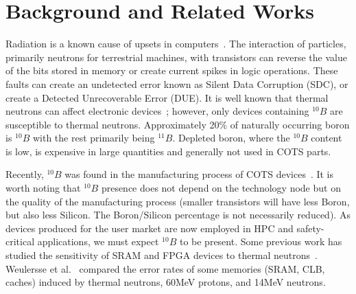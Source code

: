 \section{Background and Related Works}
\label{sec_background}

%

Radiation is a known cause of upsets in computers~\cite{Jedec2006}. The interaction of particles, primarily neutrons for terrestrial machines, with transistors can reverse the value of the bits stored in memory or create current spikes in logic operations. These faults can create an undetected error known as Silent Data Corruption (SDC), or create a Detected Unrecoverable Error (DUE). It is well known that thermal neutrons can affect electronic devices~\cite{Baumann2005, ziegler2003}; however, only devices containing $^{10}B$ are susceptible to thermal neutrons. 
Approximately 20\% of naturally occurring boron is $^{10}B$ with the rest primarily being $^{11}B$. Depleted boron, where the $^{10}B$ content is low, is expensive in large quantities and generally not used in COTS parts. %

Recently, $^{10}B$ was found in the manufacturing process of COTS devices~\cite{wen2010b10}. It is worth noting that $^{10}B$ presence does not depend on the technology node but on the quality of the manufacturing process (smaller transistors will have less Boron, but also less Silicon. The Boron/Silicon percentage is not necessarily reduced). As devices produced for the user market are now employed in HPC and safety-critical applications, we must expect $^{10}B$ to be present. 
Some previous work has studied the sensitivity of SRAM and FPGA devices to thermal neutrons~\cite{lee2015radiation,fang2016characterization}. Weulersse et al.~\cite{weulersse2018contribution} compared the error rates of some memories (SRAM, CLB, caches) induced by thermal neutrons, 60MeV protons, and 14MeV neutrons. %


